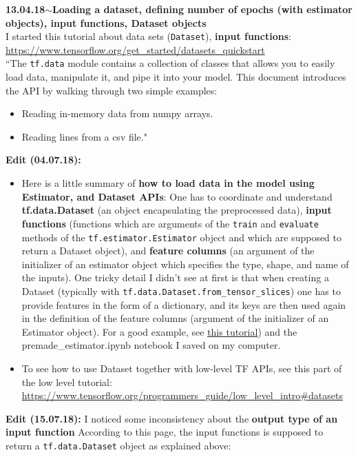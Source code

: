 \documentclass[11pt,a4paper]{article}
\newenvironment{loggentry}[2]%
{\noindent\textbf{#1}\hspace{1cm}$\mathbf{\sim}$\text{ }\textbf{#2}\\}{\vspace{0.5cm}}
\begin{document}
\begin{loggentry}{13.04.18}{Loading a dataset, defining number of epochs (with estimator objects), input functions, Dataset objects}
I started this tutorial about data sets (\texttt{Dataset}), \textbf{input functions}:\\
\url{https://www.tensorflow.org/get_started/datasets_quickstart}\\
``The \texttt{tf.data} module contains a collection of classes that allows you to easily load data, manipulate it, and pipe it into your model. This document introduces the API by walking through two simple examples:
\begin{itemize}
\item Reading in-memory data from numpy arrays.
\item Reading lines from a csv file."
\end{itemize}
\textbf{Edit (04.07.18):} \begin{itemize}
\item Here is a little summary of \textbf{how to load data in the model using Estimator, and Dataset APIs}: One has to coordinate and understand \textbf{tf.data.Dataset} (an object encapsulating the preprocessed data), \textbf{input functions} (functions which are arguments of the \texttt{train} and \texttt{evaluate} methods of the \texttt{tf.estimator.Estimator} object and which are supposed to return a Dataset object), and \textbf{feature columns} (an argument of the initializer of an estimator object which specifies the type, shape, and name of the inputs). One tricky detail I didn't see at first is that when creating a Dataset (typically with \texttt{tf.data.Dataset.from\_tensor\_slices}) one has to provide features in the form of a dictionary, and its keys are then used again in the definition of the feature columns (argument of the initializer of an Estimator object). For a good example, see \href{https://www.tensorflow.org/get_started/premade_estimators}{this tutorial}) and the premade\_estimator.ipynb notebook I saved on my computer.\\
\item To see how to use Dataset together with low-level TF APIs, see this part of the low level tutorial:\\
\url{https://www.tensorflow.org/programmers_guide/low_level_intro#datasets}
\end{itemize}
\textbf{Edit (15.07.18):} I noticed some inconsistency about the \textbf{output type of an input function} According to this page, the input functions is supposed to return a \texttt{tf.data.Dataset} object as explained above:\\

\end{loggentry}
\end{document}
